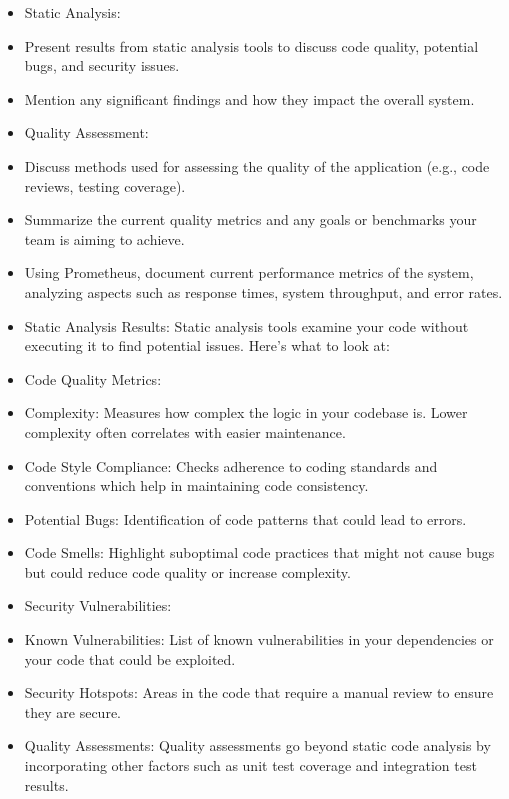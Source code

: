 \documentclass[12pt, a4paper, oneside]{book}
\begin{document}
\begin{spacing}{1.5}
\begin{itemize}
\item Static Analysis:
\item Present results from static analysis tools to discuss code quality, potential bugs, and security issues.
\item Mention any significant findings and how they impact the overall system.
\item Quality Assessment:
\item Discuss methods used for assessing the quality of the application (e.g., code reviews, testing coverage).
\item Summarize the current quality metrics and any goals or benchmarks your team is aiming to achieve.
\item Using Prometheus, document current performance metrics of the system, analyzing aspects such as response times, system throughput, and error rates.

\end{itemize}

\begin{itemize}

    \item[1.] Static Analysis Results:
Static analysis tools examine your code without executing it to find potential issues. Here's what to look at:

\item Code Quality Metrics:
\item Complexity: Measures how complex the logic in your codebase is. Lower complexity often correlates with easier maintenance.
\item Code Style Compliance: Checks adherence to coding standards and conventions which help in maintaining code consistency.
\item Potential Bugs: Identification of code patterns that could lead to errors.
\item Code Smells: Highlight suboptimal code practices that might not cause bugs but could reduce code quality or increase complexity.
\item Security Vulnerabilities:
\item Known Vulnerabilities: List of known vulnerabilities in your dependencies or your code that could be exploited.
\item Security Hotspots: Areas in the code that require a manual review to ensure they are secure.
\item[2.] Quality Assessments:
Quality assessments go beyond static code analysis by incorporating other factors such as unit test coverage and integration test results.



\end{itemize}
\end{spacing}
\end{document}
